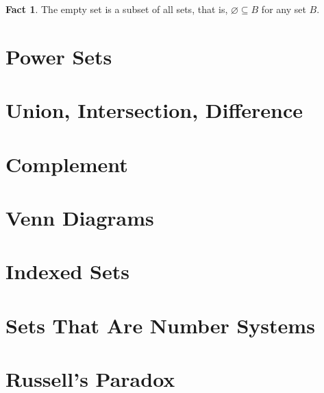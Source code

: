 \documentclass[10pt]{article}
\theoremstyle{definition}
\newtheorem{fact}{Fact}
\begin{document}
\begin{fact}
    The empty set is a subset of all sets, that is, $\varnothing \subseteq B$ for any set $B$.
\end{fact}





\section{Power Sets}

\section{Union, Intersection, Difference}

\section{Complement}

\section{Venn Diagrams}

\section{Indexed Sets}

\section{Sets That Are Number Systems}

\section{Russell's Paradox}

\end{document}
